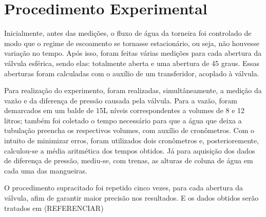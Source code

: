\chapter{Procedimento Experimental}
\label{chap:procedimento}



Inicialmente, antes das medições, o fluxo de água da torneira foi controlado de
modo que o regime de escoamento se tornasse estacionário, ou seja, não houvesse
variação no tempo. Após isso, foram feitas várias medições para cada abertura da
válvula esférica, sendo elas: totalmente aberta e uma abertura de 45 graus.
Essas aberturas foram calculadas com o auxílio de um transferidor, acoplado à
válvula. 

Para realização do experimento, foram realizadas, simultâneamente, a medição da
vazão e da diferença de pressão causada pela válvula. Para a vazão, foram
demarcados em um balde de 15L níveis correspondentes a volumes de 8 e 12 litros;
também foi coletado o tempo necessário para que a água que deixa a tubulação
preencha os respectivos volumes, com auxílio de cronômetros.  Com o intuito de
minimizar erros, foram utilizados dois cronômetros e, posterioremente,
calculou-se a média aritmética dos tempos obtidos. Já para aquisição dos dados
de diferença de pressão, mediu-se, com trenas, as alturas de coluna de água em
cada uma das mangueiras.

O procedimento supracitado foi repetido cinco vezes, para cada abertura da
válvula, afim de garantir maior precisão nos resultados. E os dados obtidos
serão tratados em (REFERENCIAR)



